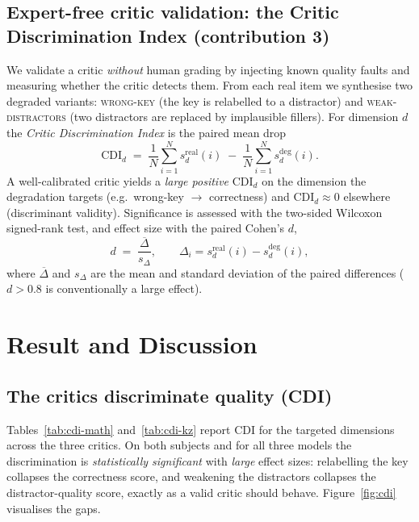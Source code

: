 \documentclass[11pt]{article}
\begin{document}
\subsection{Expert-free critic validation: the Critic Discrimination Index (contribution 3)}
We validate a critic \emph{without} human grading by injecting known quality
faults and measuring whether the critic detects them. From each real item we
synthesise two degraded variants: \textsc{wrong-key} (the key is relabelled to
a distractor) and \textsc{weak-distractors} (two distractors are replaced by
implausible fillers). For dimension $d$ the \emph{Critic Discrimination Index}
is the paired mean drop
\begin{equation}
\mathrm{CDI}_d \;=\; \frac{1}{N}\sum_{i=1}^{N} s_d^{\text{real}}(i)
\;-\; \frac{1}{N}\sum_{i=1}^{N} s_d^{\text{deg}}(i).
\label{eq:cdi}
\end{equation}
A well-calibrated critic yields a \emph{large positive} $\mathrm{CDI}_d$ on the
dimension the degradation targets (e.g.\ wrong-key $\rightarrow$ correctness)
and $\mathrm{CDI}_d\!\approx\!0$ elsewhere (discriminant validity). Significance
is assessed with the two-sided Wilcoxon signed-rank test, and effect size with
the paired Cohen's $d$,
\begin{equation}
d \;=\; \frac{\overline{\Delta}}{s_\Delta},\qquad
\Delta_i = s_d^{\text{real}}(i) - s_d^{\text{deg}}(i),
\label{eq:cohend}
\end{equation}
where $\overline{\Delta}$ and $s_\Delta$ are the mean and standard deviation of
the paired differences ($d>0.8$ is conventionally a large effect).

\section{Result and Discussion}

\subsection{The critics discriminate quality (CDI)}
Tables~\ref{tab:cdi-math} and~\ref{tab:cdi-kz} report CDI for the targeted
dimensions across the three critics. On both subjects and for all three models
the discrimination is \emph{statistically significant} with \emph{large} effect
sizes: relabelling the key collapses the correctness score, and weakening the
distractors collapses the distractor-quality score, exactly as a valid critic
should behave. Figure~\ref{fig:cdi} visualises the gaps.
\end{document}
